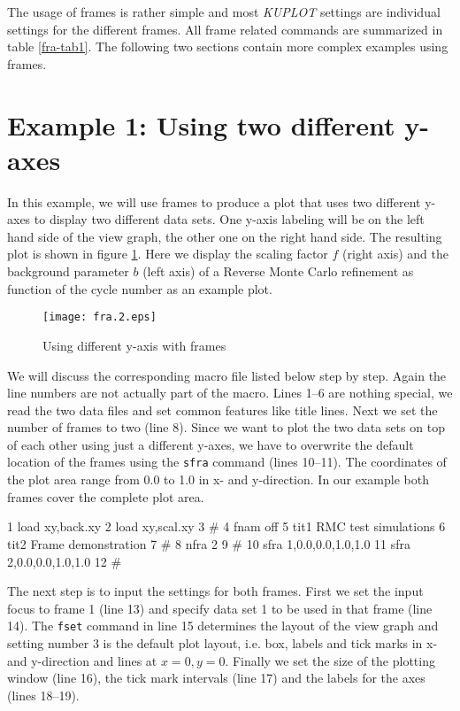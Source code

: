 The usage of frames is rather simple and most {\it KUPLOT} settings
are individual settings for the different frames. All frame related
commands are summarized in table \ref{fra-tab1}. The following two
sections contain more complex examples using frames.


\section{Example 1: Using two different y-axes \label{frame-exa1}}

In this example, we will use frames to produce a plot that uses two
different y-axes to display two different data sets.  One y-axis
labeling will be on the left hand side of the view graph, the other
one on the right hand side.  The resulting plot is shown in figure
\ref{fra-fig2}. Here we display the scaling factor $f$ (right axis)
and the background parameter $b$ (left axis) of a Reverse Monte
Carlo refinement as function of the cycle number as an example plot.

\begin{figure}[!tb]
   \centering
   \texttt{[image: fra.2.eps]}
   \caption{Using different y-axis with frames}
   \label{fra-fig2}
\end{figure}

We will discuss the corresponding macro file listed below step by
step. Again the line numbers are not actually part of the macro.
Lines 1--6 are nothing special, we read the two data files and set
common features like title lines.  Next we set the number of frames
to two (line 8). Since we want to plot the two data sets on top of
each other using just a different y-axes, we have to overwrite the
default location of the frames using the {\tt sfra} command (lines
10--11). The coordinates of the plot area range from 0.0 to 1.0 in
x- and y-direction. In our example both frames cover the complete
plot area.

\begin{MacVerbatim}
     1  load xy,back.xy
     2  load xy,scal.xy
     3  #
     4  fnam off
     5  tit1 RMC test simulations
     6  tit2 Frame demonstration
     7  #
     8  nfra 2
     9  #
    10  sfra 1,0.0,0.0,1.0,1.0
    11  sfra 2,0.0,0.0,1.0,1.0
    12  #
\end{MacVerbatim}

The next step is to input the settings for both frames. First we set
the input focus to frame 1 (line 13) and specify data set 1 to be
used in that frame (line 14). The {\tt fset} command in line 15
determines the layout of the view graph and setting number 3 is the
default plot layout, i.e. box, labels and tick marks in x- and
y-direction and lines at $x=0, y=0$. Finally we set the size of the
plotting window (line 16), the tick mark intervals (line 17) and the
labels for the axes (lines 18--19).

